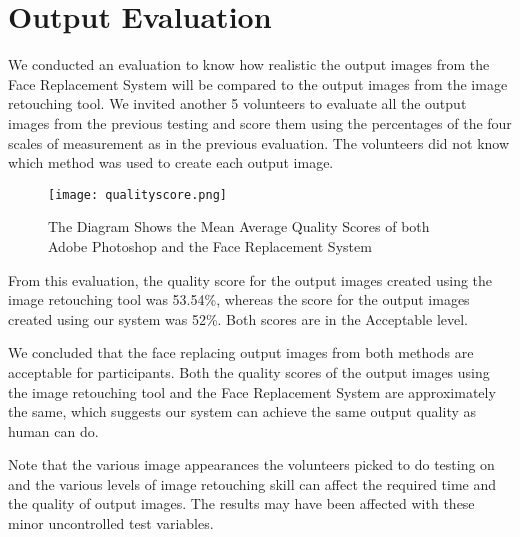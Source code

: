 \section{Output Evaluation}
\hspace{0.5in}We conducted an evaluation to know how realistic the output images from the Face Replacement System will be compared to the output images from the image retouching tool. We invited another 5 volunteers to evaluate all the output images from the previous testing and score them using the percentages of the four scales of measurement as in the previous evaluation. The volunteers did not know which method was used to create each output image.

\begin{figure}[htb]
   \centering
   \texttt{[image: qualityscore.png]}
   \caption{The Diagram Shows the Mean Average Quality Scores of both Adobe Photoshop and the Face Replacement System}
   \label{fig:QualityScore}
\end{figure}

From this evaluation, the quality score for the output images created using the image retouching tool was 53.54\%, whereas the score for the output images created using our system was 52\%. Both scores are in the Acceptable level.


We concluded that the face replacing output images from both methods are acceptable for participants. Both the quality scores of the output images using the image retouching tool and the Face Replacement System are approximately the same, which suggests our system can achieve the same output quality as human can do.

Note that the various image appearances the volunteers picked to do testing on and the various levels of image retouching skill can affect the required time and the quality of output images. The results may have been affected with these minor uncontrolled test variables.
